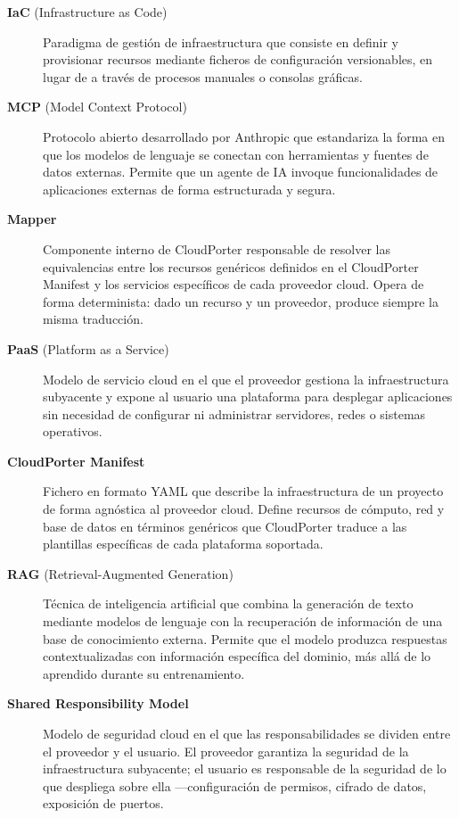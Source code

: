\begin{description}
    \item [\hypertarget{iac}{\textbf{IaC}} (Infrastructure as Code)]
    Paradigma de gestión de infraestructura que consiste en definir y provisionar
    recursos mediante ficheros de configuración versionables, en lugar de a través
    de procesos manuales o consolas gráficas.

    \item [\hypertarget{mcp}{\textbf{MCP}} (Model Context Protocol)]
    Protocolo abierto desarrollado por Anthropic que estandariza la forma en que
    los modelos de lenguaje se conectan con herramientas y fuentes de datos externas.
    Permite que un agente de IA invoque funcionalidades de aplicaciones externas
    de forma estructurada y segura.

    \item [\hypertarget{mapper}{\textbf{Mapper}}]
    Componente interno de CloudPorter responsable de resolver las equivalencias entre
    los recursos genéricos definidos en el CloudPorter Manifest y los servicios
    específicos de cada proveedor cloud. Opera de forma determinista: dado un
    recurso y un proveedor, produce siempre la misma traducción.

    \item [\hypertarget{paas}{\textbf{PaaS}} (Platform as a Service)]
    Modelo de servicio cloud en el que el proveedor gestiona la infraestructura
    subyacente y expone al usuario una plataforma para desplegar aplicaciones sin
    necesidad de configurar ni administrar servidores, redes o sistemas operativos.

    \item [\hypertarget{cloudporter-manifest}{\textbf{CloudPorter Manifest}}]
    Fichero en formato YAML que describe la infraestructura de un proyecto de
    forma agnóstica al proveedor cloud. Define recursos de cómputo, red y base de
    datos en términos genéricos que CloudPorter traduce a las plantillas específicas
    de cada plataforma soportada.

    \item [\hypertarget{rag}{\textbf{RAG}} (Retrieval-Augmented Generation)]
    Técnica de inteligencia artificial que combina la generación de texto mediante
    modelos de lenguaje con la recuperación de información de una base de
    conocimiento externa. Permite que el modelo produzca respuestas contextualizadas
    con información específica del dominio, más allá de lo aprendido durante su
    entrenamiento.

    \item [\hypertarget{shared-responsibility}{\textbf{Shared Responsibility Model}}]
    Modelo de seguridad cloud en el que las responsabilidades se dividen entre el
    proveedor y el usuario. El proveedor garantiza la seguridad de la infraestructura
    subyacente; el usuario es responsable de la seguridad de lo que despliega sobre
    ella —configuración de permisos, cifrado de datos, exposición de puertos.


\end{description}
